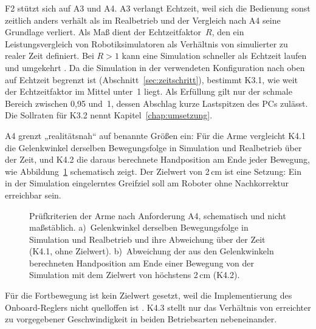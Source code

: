 F2 stützt sich auf A3 und A4. A3 verlangt Echtzeit, weil sich die Bedienung sonst zeitlich anders verhält als im Realbetrieb und der Vergleich nach A4 seine Grundlage verliert.
Als Maß dient der Echtzeitfaktor~$R$, den ein Leistungsvergleich von Robotiksimulatoren als Verhältnis von simulierter zu realer Zeit definiert. Bei $R > 1$ kann eine Simulation schneller als Echtzeit laufen und umgekehrt \cite{Pitonakova2018}.
Da die Simulation in der verwendeten Konfiguration nach oben auf Echtzeit begrenzt ist (Abschnitt~\ref{sec:zeitschritt}), bestimmt K3.1, wie weit der Echtzeitfaktor im Mittel unter~1 liegt.
Als Erfüllung gilt nur der schmale Bereich zwischen 0,95 und~1, dessen Abschlag kurze Lastspitzen des PCs zulässt. Die Sollraten für K3.2 nennt Kapitel~\ref{chap:umsetzung}.

A4 grenzt „realitätsnah“ auf benannte Größen ein: Für die Arme vergleicht K4.1 die Gelenkwinkel derselben Bewegungsfolge in Simulation und Realbetrieb über der Zeit, und K4.2 die daraus berechnete Handposition am Ende jeder Bewegung, wie Abbildung~\ref{fig:handtoleranz} schematisch zeigt.
Der Zielwert von 2\,cm ist eine Setzung: Ein in der Simulation eingelerntes Greifziel soll am Roboter ohne Nachkorrektur erreichbar sein.

\begin{figure}[!htbp]
  \centering
  
  \caption[Prüfkriterien der Arme nach Anforderung A4]{Prüfkriterien der Arme nach Anforderung A4, schematisch und nicht maßstäblich. a)~Gelenkwinkel derselben Bewegungsfolge in Simulation und Realbetrieb und ihre Abweichung über der Zeit (K4.1, ohne Zielwert). b)~Abweichung der aus den Gelenkwinkeln berechneten Handposition am Ende einer Bewegung von der Simulation mit dem Zielwert von höchstens 2\,cm (K4.2).}
  \label{fig:handtoleranz}
\end{figure}

Für die Fortbewegung ist kein Zielwert gesetzt, weil die Implementierung des Onboard-Reglers nicht quelloffen ist \cite{Hu2026}. K4.3 stellt nur das Verhältnis von erreichter zu vorgegebener Geschwindigkeit in beiden Betriebsarten nebeneinander.

